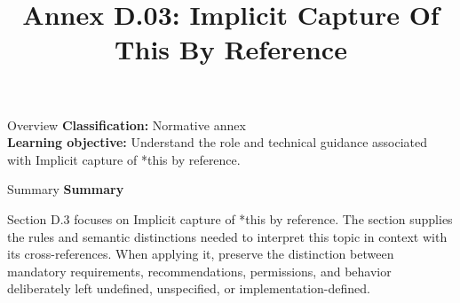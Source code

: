 \documentclass[10pt,letterpaper]{article}
\title{Annex D.03: Implicit Capture Of This By Reference}
\author{}
\date{}
\begin{document}
\maketitle
\begin{CornellOverviewBox}{Overview}
\textbf{Classification:} Normative annex\\[2pt]
\textbf{Learning objective:} Understand the role and technical guidance associated with Implicit capture of *this by reference.
\end{CornellOverviewBox}\begin{CornellSummaryBox}{Summary}
{\sffamily\bfseries\color{Accent} Summary}\par\vspace{3pt}Section D.3 focuses on Implicit capture of *this by reference. The section supplies the rules and semantic distinctions needed to interpret this topic in context with its cross-references. When applying it, preserve the distinction between mandatory requirements, recommendations, permissions, and behavior deliberately left undefined, unspecified, or implementation-defined.
\end{CornellSummaryBox}
\end{document}

